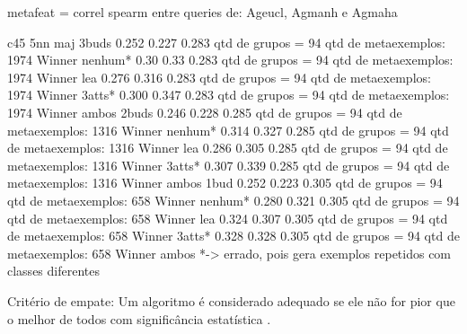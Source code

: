 metafeat = correl spearm entre queries de: Ageucl, Agmanh e Agmaha

c45    5nn   maj
3buds
0.252 0.227 0.283 qtd de grupos = 94 qtd de metaexemplos: 1974 Winner nenhum*
0.30   0.33  0.283 qtd de grupos = 94 qtd de metaexemplos: 1974 Winner lea
0.276 0.316 0.283 qtd de grupos = 94 qtd de metaexemplos: 1974 Winner 3atts*
0.300 0.347 0.283 qtd de grupos = 94 qtd de metaexemplos: 1974 Winner ambos
2buds
0.246 0.228 0.285 qtd de grupos = 94 qtd de metaexemplos: 1316 Winner nenhum*
0.314 0.327 0.285 qtd de grupos = 94 qtd de metaexemplos: 1316 Winner lea
0.286 0.305 0.285 qtd de grupos = 94 qtd de metaexemplos: 1316 Winner 3atts*
0.307 0.339 0.285 qtd de grupos = 94 qtd de metaexemplos: 1316 Winner ambos
1bud
0.252 0.223 0.305 qtd de grupos = 94 qtd de metaexemplos: 658 Winner nenhum*
0.280 0.321 0.305 qtd de grupos = 94 qtd de metaexemplos: 658 Winner lea
0.324 0.307 0.305 qtd de grupos = 94 qtd de metaexemplos: 658 Winner 3atts*
0.328 0.328 0.305 qtd de grupos = 94 qtd de metaexemplos: 658 Winner ambos
*-> errado, pois gera exemplos repetidos com classes diferentes











Critério de empate:
Um algoritmo é considerado adequado se ele não for
pior que o melhor de todos com significância estatística
\cite{books/daglib/0022052}.



